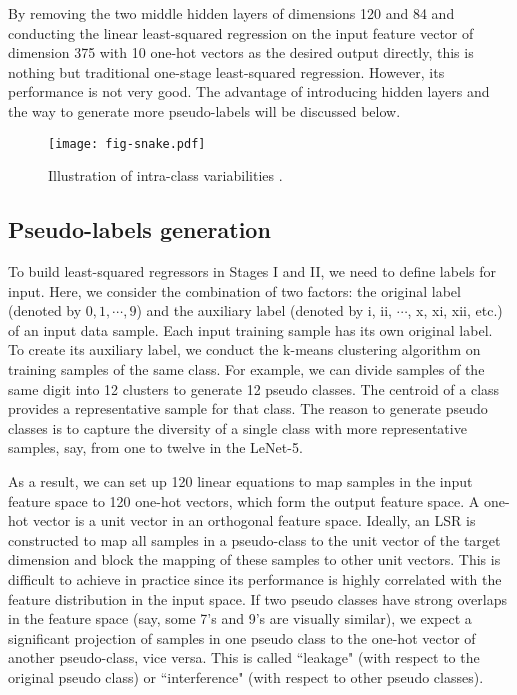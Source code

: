 \documentclass[preprint,12pt]{elsarticle}
\begin{document}
By removing the two middle hidden layers of dimensions 120 and 84 and
conducting the linear least-squared regression on the input feature
vector of dimension 375 with 10 one-hot vectors as the desired output
directly, this is nothing but traditional one-stage least-squared
regression. However, its performance is not very good. The advantage of
introducing hidden layers and the way to generate more pseudo-labels
will be discussed below. 

\begin{figure}[htb]
\centering
\texttt{[image: fig-snake.pdf]}
\caption{Illustration of intra-class variabilities \cite{kuo2017cnn}.}
\label{fig:block-diagram}
\end{figure}

\subsection{Pseudo-labels generation}\label{subsec:pseudo}

To build least-squared regressors in Stages I and II, we need to define
labels for input. Here, we consider the combination of two factors: the
original label (denoted by $0, 1, \cdots, 9$) and the auxiliary label
(denoted by i, ii, $\cdots$, x, xi, xii, etc.) of an input data sample.
Each input training sample has its own original label.  To create its
auxiliary label, we conduct the k-means clustering algorithm on training
samples of the same class. For example, we can divide samples of the
same digit into 12 clusters to generate 12 pseudo classes. The centroid
of a class provides a representative sample for that class. The reason
to generate pseudo classes is to capture the diversity of a single class
with more representative samples, say, from one to twelve in the
LeNet-5. 

As a result, we can set up 120 linear equations to map samples in the
input feature space to 120 one-hot vectors, which form the output
feature space. A one-hot vector is a unit vector in an orthogonal
feature space. Ideally, an LSR is constructed to map all samples in a
pseudo-class to the unit vector of the target dimension and block the
mapping of these samples to other unit vectors.  This is difficult to
achieve in practice since its performance is highly correlated with the
feature distribution in the input space. If two pseudo classes have
strong overlaps in the feature space (say, some 7's and 9's are visually
similar), we expect a significant projection of samples in one pseudo
class to the one-hot vector of another pseudo-class, vice versa. This is
called ``leakage" (with respect to the original pseudo class) or
``interference" (with respect to other pseudo classes). 
\end{document}
